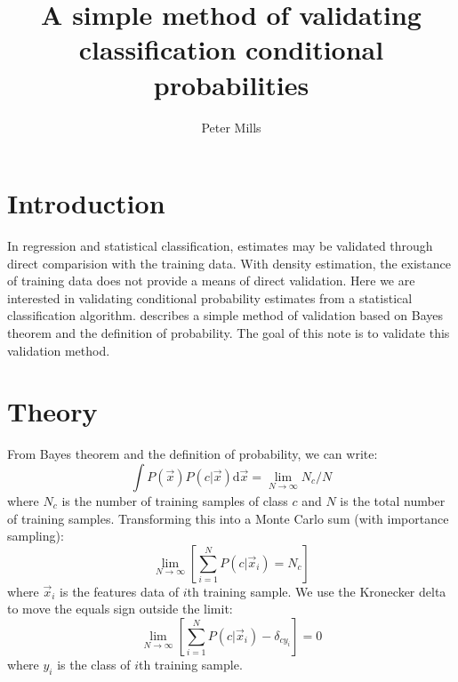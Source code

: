\documentclass{article}
\begin{document}
\title{A simple method of validating classification conditional probabilities}

\author{Peter Mills}

\maketitle

\section{Introduction}

In regression and statistical classification, estimates may be validated
through direct comparision with the training data.
With density estimation, the existance of training data does not provide
a means of direct validation.
Here we are interested in validating conditional probability estimates from a
statistical classification algorithm.
\citet{Mills2009} describes a simple method of validation based on Bayes
theorem and the definition of probability.
The goal of this note is to validate this validation method.

\section{Theory}

From Bayes theorem and the definition of probability, we can write:
\begin{equation}
	\int P(\vec x) P(c | \vec x) \mathrm d \vec x = \lim_{N \rightarrow \infty} N_c/N
\end{equation}
where $N_c$ is the number of training samples of class $c$ and $N$ is the 
total number of training samples.
Transforming this into a Monte Carlo sum (with importance sampling):
\begin{equation}
	\lim_{N \rightarrow \infty} \left [ \sum_{i=1}^N P(c | \vec x_i) = N_c \right ]
\end{equation}
where $\vec x_i$ is the features data of $i$th training sample.
We use the Kronecker delta 
to move the equals sign outside the limit:
\begin{equation}
	\lim_{N \rightarrow \infty} \left [ \sum_{i=1}^N P(c | \vec x_i) - \delta_{cy_i} \right ] = 0 \label{theorem}
\end{equation}
where $y_i$ is the class of $i$th training sample.
\end{document}
